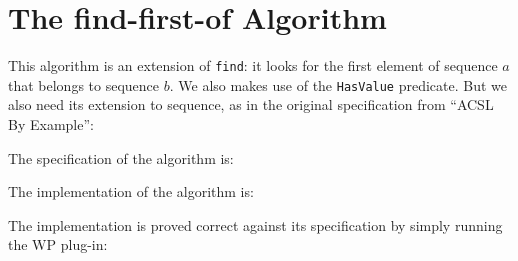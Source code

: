 \section{The \textsf{find-first-of} Algorithm}
\label{find-first-of}

This algorithm is an extension of \texttt{find}: it looks for the
first element of sequence $a$ that belongs to sequence $b$. We also
makes use of the \texttt{HasValue} predicate. But we also need its
extension to sequence, as in the original specification from
``ACSL By Example'':


The specification of the algorithm is:


The implementation of the algorithm is:


The implementation is proved correct against its specification by
simply running the \textsf{WP} plug-in: 
